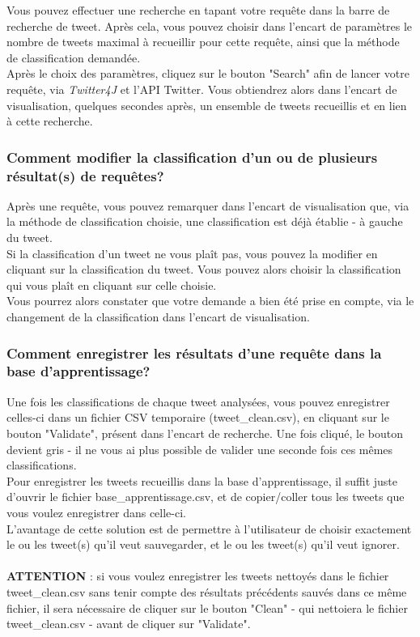 \documentclass[pdftex,12pt,a4paper]{report}
\begin{document}
\begin{spacing}{1.2}
Vous pouvez effectuer une recherche en tapant votre requête dans la barre de recherche de tweet. Après cela, vous pouvez choisir dans l'encart de paramètres le nombre de tweets maximal à recueillir pour cette requête, ainsi que la méthode de classification demandée.
\\
Après le choix des paramètres, cliquez sur le bouton "Search" afin de lancer votre requête, via \textit{Twitter4J} et l'API Twitter. Vous obtiendrez alors dans l'encart de visualisation, quelques secondes après, un ensemble de tweets recueillis et en lien à cette recherche.

\subsubsection{Comment modifier la classification d'un ou de plusieurs résultat(s) de requêtes?}

Après une requête, vous pouvez remarquer dans l'encart de visualisation que, via la méthode de classification choisie, une classification est déjà établie - à gauche du tweet.
\\
Si la classification d'un tweet ne vous plaît pas, vous pouvez la modifier en cliquant sur la classification du tweet. Vous pouvez alors choisir la classification qui vous plaît en cliquant sur celle choisie.
\\
Vous pourrez alors constater que votre demande a bien été prise en compte, via le changement de la classification dans l'encart de visualisation.

\subsubsection{Comment enregistrer les résultats d'une requête dans la base d'apprentissage?}

Une fois les classifications de chaque tweet analysées, vous pouvez enregistrer celles-ci dans un fichier CSV temporaire (tweet\_clean.csv), en cliquant sur le bouton "Validate", présent dans l'encart de recherche. Une fois cliqué, le bouton devient gris - il ne vous ai plus possible de valider une seconde fois ces mêmes classifications.
\\
Pour enregistrer les tweets recueillis dans la base d'apprentissage, il suffit juste d'ouvrir le fichier base\_apprentissage.csv, et de copier/coller tous les tweets que vous voulez enregistrer dans celle-ci.
\\
L'avantage de cette solution est de permettre à l'utilisateur de choisir exactement le ou les tweet(s) qu'il veut sauvegarder, et le ou les tweet(s) qu'il veut ignorer.
\\
\\
\textbf{ATTENTION} : si vous voulez enregistrer les tweets nettoyés dans le fichier tweet\_clean.csv sans tenir compte des résultats précédents sauvés dans ce même fichier, il sera nécessaire de cliquer sur le bouton "Clean" - qui nettoiera le fichier tweet\_clean.csv - avant de cliquer sur "Validate".


\end{spacing}
\end{document}

